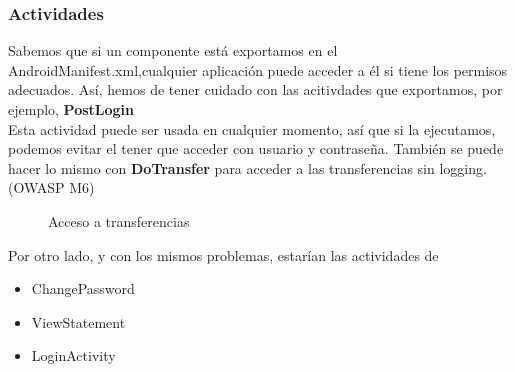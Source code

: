 \documentclass[12pt,twoside]{article}
\begin{document}
\subsubsection{Actividades}
Sabemos que si un componente está exportamos  en el AndroidManifest.xml,cualquier aplicación puede acceder a él si tiene los permisos adecuados. Así, hemos de tener cuidado con las acitivdades que exportamos, por ejemplo, \textbf{PostLogin}\\
Esta actividad puede ser usada en cualquier momento, así que si la ejecutamos, podemos evitar el tener que acceder con usuario y contraseña. También se puede hacer lo mismo con \textbf{DoTransfer} para acceder a las transferencias sin logging. (OWASP M6)
\begin{figure}[H]
    \centering
    \caption{Acceso a transferencias}
\end{figure}
Por otro lado, y con los mismos problemas, estarían las actividades de
\begin{itemize}
    \item ChangePassword
    \item ViewStatement
    \item LoginActivity
\end{itemize}
\end{document}
